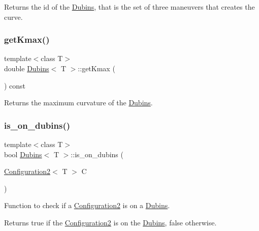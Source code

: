 Returns the id of the \mbox{\hyperlink{class_dubins}{Dubins}}, that is the set of three maneuvers that creates the curve. 

\mbox{\label{class_dubins_aa3380b8d556cc954119e0c12dbe81194}} 
\subsubsection{\texorpdfstring{getKmax()}{getKmax()}}
{\footnotesize\ttfamily template$<$class T$>$ \\
double \mbox{\hyperlink{class_dubins}{Dubins}}$<$ T $>$\+::get\+Kmax (\begin{DoxyParamCaption}{ }\end{DoxyParamCaption}) const\hspace{0.3cm}{\ttfamily [inline]}}



Returns the maximum curvature of the \mbox{\hyperlink{class_dubins}{Dubins}}. 

\mbox{\label{class_dubins_af8555d27092df352f0680da1d8057ee2}} 
\subsubsection{\texorpdfstring{is\_on\_dubins()}{is\_on\_dubins()}}
{\footnotesize\ttfamily template$<$class T$>$ \\
bool \mbox{\hyperlink{class_dubins}{Dubins}}$<$ T $>$\+::is\+\_\+on\+\_\+dubins (\begin{DoxyParamCaption}\item[{\mbox{\hyperlink{class_configuration2}{Configuration2}}$<$ T $>$}]{C }\end{DoxyParamCaption})\hspace{0.3cm}{\ttfamily [inline]}}

Function to check if a {\ttfamily \mbox{\hyperlink{class_configuration2}{Configuration2}}} is on a {\ttfamily \mbox{\hyperlink{class_dubins}{Dubins}}}. \begin{DoxyReturn}{Returns}
{\ttfamily true} if the {\ttfamily \mbox{\hyperlink{class_configuration2}{Configuration2}}} is on the {\ttfamily \mbox{\hyperlink{class_dubins}{Dubins}}}, {\ttfamily false} otherwise. 
\end{DoxyReturn}
\mbox{\label{class_dubins_ae4978fe0667d364224c0a7521903a225}} 
